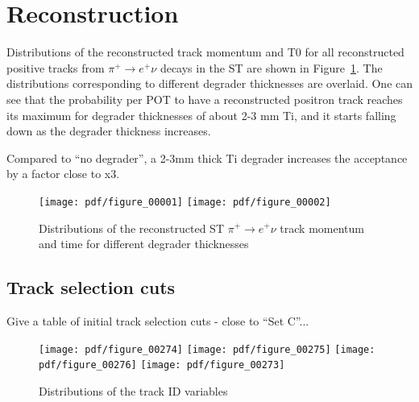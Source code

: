 \newpage
\section {Reconstruction }

Distributions of the reconstructed track momentum and T0 for all reconstructed positive
tracks from $\pi^+ \to e^+ \nu $ decays in the ST are shown in Figure~\ref{fig:all_tracks_p_t0}.
The distributions corresponding to different degrader thicknesses are overlaid.
One can see that the probability per POT to have a reconstructed positron track reaches its maximum
for degrader thicknesses of about 2-3 mm Ti, and it starts falling down as the degrader thickness
increases.

Compared to ``no degrader'', a 2-3mm thick Ti degrader increases the acceptance by a factor
close to x3.

\begin{figure}[H]
  \texttt{[image: pdf/figure\_00001]}
  \texttt{[image: pdf/figure\_00002]}
  \caption{
    \label{fig:all_tracks_p_t0}
    Distributions of the reconstructed ST $\pi^+ \to e^+ \nu$ track momentum and time
    for different degrader thicknesses
  }
\end{figure}

\subsection{Track selection cuts}

Give a table of initial track selection cuts - close to ``Set C''...

\begin{figure}[H]
  \texttt{[image: pdf/figure\_00274]}  %
  \texttt{[image: pdf/figure\_00275]}  %
  \texttt{[image: pdf/figure\_00276]}  %
  \texttt{[image: pdf/figure\_00273]}  %
  \caption{
    \label{fig:tid_variables}
    Distributions of the track ID variables 
  }
\end{figure}

